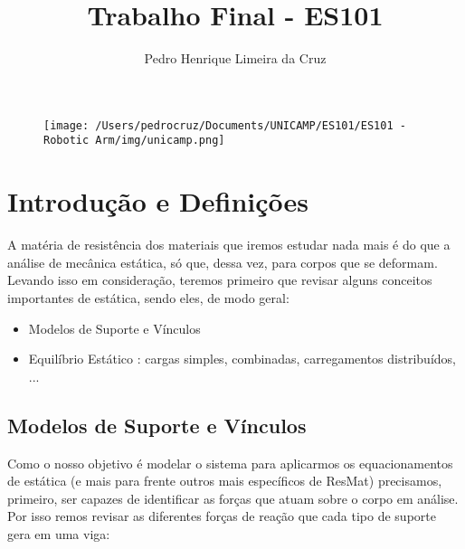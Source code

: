 \documentclass{article}
\author{Pedro Henrique Limeira da Cruz}
\title{Trabalho Final - ES101}
\begin{document}
    \maketitle
    \thispagestyle{empty}

    \begin{figure}[h]
        \begin{center}
            \texttt{[image: /Users/pedrocruz/Documents/UNICAMP/ES101/ES101 - Robotic Arm/img/unicamp.png]}
        \end{center}
    \end{figure}

    \newpage
    \tableofcontents
    \newpage

    \section{Introdução e Definições}

        A matéria de resistência dos materiais que iremos estudar nada mais é do que a análise de mecânica estática, só que, dessa vez, para corpos que se deformam.
        Levando isso em consideração, teremos primeiro que revisar alguns conceitos importantes de estática, sendo eles, de modo geral:
        \begin{itemize}
            \item Modelos de Suporte e Vínculos
            \item Equilíbrio Estático : cargas simples, combinadas, carregamentos distribuídos, ...
        \end{itemize}

        \subsection{Modelos de Suporte e Vínculos}

            Como o nosso objetivo é modelar o sistema para aplicarmos os equacionamentos de estática (e mais para frente outros mais específicos de ResMat) precisamos, primeiro, ser capazes de
            identificar as forças que atuam sobre o corpo em análise. Por isso remos revisar as diferentes forças de reação que cada tipo de suporte gera em uma viga:
\end{document}
